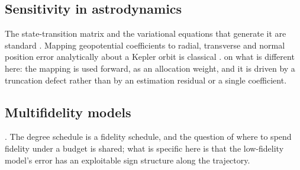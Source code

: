 \subsection{Sensitivity in astrodynamics}

The state-transition matrix and the variational equations that generate it are
standard \citep[Ch.~4]{tapley2004statistical}. Mapping geopotential
coefficients to radial, transverse and normal position error analytically about
a Kepler orbit is classical \citep{rosborough1987radial}.  on what is different here: the mapping is used forward, as an
allocation weight, and it is driven by a truncation defect rather than by an
estimation residual or a single coefficient.

\subsection{Multifidelity models}

 \citep{peherstorfer2018multifidelity,
jones2019multifidelity}. The degree schedule is a fidelity schedule, and the
question of where to spend fidelity under a budget is shared; what is specific
here is that the low-fidelity model's error has an exploitable sign structure
along the trajectory.
